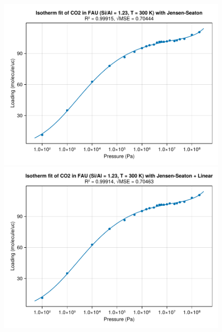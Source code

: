 \documentclass[main.tex]{subfiles}
\begin{document}
\begin{figure}
	\begin{minipage}{0.49\columnwidth}
		\includegraphics[width=\columnwidth]{figures/isotherms/Jensen-Seaton.pdf}
	\end{minipage}\hfill%
	\begin{minipage}{0.49\columnwidth}
		\includegraphics[width=\columnwidth]{figures/isotherms/Jensen-Seaton + Linear.pdf}
	\end{minipage}


\end{figure}
\end{document}
